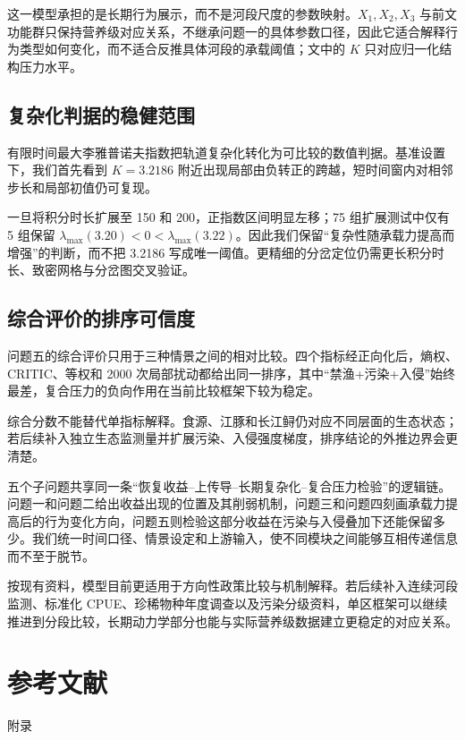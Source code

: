 \documentclass{MMCStyle}
\begin{document}
这一模型承担的是长期行为展示，而不是河段尺度的参数映射。$X_1,X_2,X_3$ 与前文功能群只保持营养级对应关系，不继承问题一的具体参数口径，因此它适合解释行为类型如何变化，而不适合反推具体河段的承载阈值；文中的 $K$ 只对应归一化结构压力水平。

\subsection{复杂化判据的稳健范围}
有限时间最大李雅普诺夫指数把轨道复杂化转化为可比较的数值判据。基准设置下，我们首先看到 $K=3.2186$ 附近出现局部由负转正的跨越，短时间窗内对相邻步长和局部初值仍可复现。

一旦将积分时长扩展至 150 和 200，正指数区间明显左移；75 组扩展测试中仅有 5 组保留 $\lambda_{\max}(3.20)<0<\lambda_{\max}(3.22)$。因此我们保留“复杂性随承载力提高而增强”的判断，而不把 3.2186 写成唯一阈值。更精细的分岔定位仍需更长积分时长、致密网格与分岔图交叉验证。

\subsection{综合评价的排序可信度}
问题五的综合评价只用于三种情景之间的相对比较。四个指标经正向化后，熵权、CRITIC、等权和 2000 次局部扰动都给出同一排序，其中“禁渔+污染+入侵”始终最差，复合压力的负向作用在当前比较框架下较为稳定。

综合分数不能替代单指标解释。食源、江豚和长江鲟仍对应不同层面的生态状态；若后续补入独立生态监测量并扩展污染、入侵强度梯度，排序结论的外推边界会更清楚。

\noindent 五个子问题共享同一条“恢复收益--上传导--长期复杂化--复合压力检验”的逻辑链。问题一和问题二给出收益出现的位置及其削弱机制，问题三和问题四刻画承载力提高后的行为变化方向，问题五则检验这部分收益在污染与入侵叠加下还能保留多少。我们统一时间口径、情景设定和上游输入，使不同模块之间能够互相传递信息而不至于脱节。

\noindent 按现有资料，模型目前更适用于方向性政策比较与机制解释。若后续补入连续河段监测、标准化 CPUE、珍稀物种年度调查以及污染分级资料，单区框架可以继续推进到分段比较，长期动力学部分也能与实际营养级数据建立更稳定的对应关系。

\section{参考文献}
\printbibliography[heading=none]

\appendix
\begin{center}
\heiti{} 附\hspace{1pc}录
\end{center}
\end{document}

